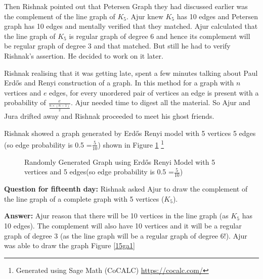 Then Rishnak pointed out that Petersen Graph they had discussed earlier was the complement of the line graph of $K_5$. Ajur knew $K_5$ has 10 edges and Petersen graph has 10 edges and mentally verified that they matched. Ajur calculated that the line graph of $K_5$ is regular graph of degree 6 and hence its complement will be regular graph of degree 3 and that matched. But still he had to verify Rishnak's assertion. He decided to work on it later.

Rishnak realising that it was getting late, spent a few minutes talking about Paul Erd\H{o}s and Renyi construction of a graph. In this method for a graph with $n$ vertices and $e$ edges, for every unordered pair of vertices  an edge is present with a probability of $\frac{e}{\frac{n \times (n-1)}{2}}$. Ajur needed time to digest all the material. So Ajur and Jura drifted away and Rishnak proceeded to meet his ghost friends.

Rishnak showed a graph generated by Erd\H{o}s Renyi model with 5 vertices 5 edges (so edge probability is 0.5  =$ \frac{5}{10}$) shown in Figure \ref {17g9} \footnote{Generated using Sage Math (CoCALC) \url{https://cocalc.com/}}
\begin{figure}
\begin{center}
\caption{ Randomly Generated Graph using Erd\H{o}s Renyi Model with 5 vertices and 5 edges(so edge probability is 0.5  =$ \frac{5}{10}$)  }\label{17g9}
\end{center}
\end{figure}

\textbf{Question for fifteenth day:} Rishnak asked Ajur to draw the complement of the line graph of a complete graph with 5 vertices ($K_5$).

\textbf{Answer:} Ajur reason that there will be 10 vertices in the line graph (as $K_5$ has 10 edges). The complement will also have 10 vertices and it will be a regular graph of degree 3 (as the line graph will be a regular graph of degree 6!). Ajur was able to draw the graph Figure \ref{15ga1}

